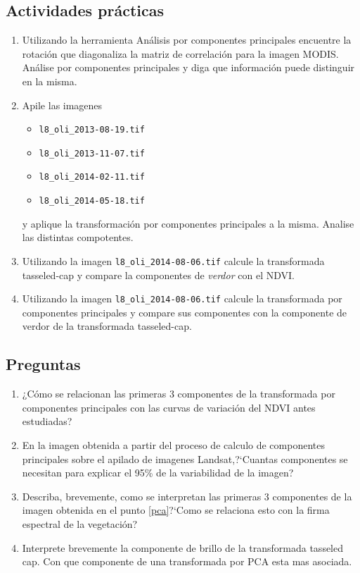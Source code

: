 \documentclass[hidelinks,12pt]{article}
\begin{document}
\subsection{Actividades pr\'acticas}\label{rot:pra}
\begin{enumerate}
    \item Utilizando la herramienta Análisis por componentes principales
        encuentre la rotación que diagonaliza la matriz de correlación para la
        imagen MODIS\@. Análise por componentes principales y diga que información puede
        distinguir en la misma. 
    \item \label{pca} Apile las imagenes
        \begin{itemize}
        \item \texttt{l8\_oli\_2013-08-19.tif}
        \item \texttt{l8\_oli\_2013-11-07.tif}
        \item \texttt{l8\_oli\_2014-02-11.tif}
        \item \texttt{l8\_oli\_2014-05-18.tif}
        \end{itemize}
        y aplique la transformaci\'on por componentes principales a la misma.
        Analise las distintas compotentes.
    \item Utilizando la imagen \texttt{l8\_oli\_2014-08-06.tif} calcule la 
        transformada tasseled-cap y compare la componentes de \emph{verdor} con el NDVI.
    \item Utilizando la imagen \texttt{l8\_oli\_2014-08-06.tif} calcule la 
        transformada por componentes principales y compare sus componentes con la
        componente de verdor de la transformada tasseled-cap.
\end{enumerate}

\subsection{Preguntas}
\begin{enumerate}
    \item ¿Cómo se relacionan las primeras 3 componentes de la transformada por
        componentes principales con las curvas de variación del NDVI antes
        estudiadas? 
    \item En la imagen obtenida a partir del proceso de calculo de componentes
        principales sobre el apilado de imagenes Landsat,?`Cuantas componentes
        se necesitan para explicar el 95\% de la variabilidad de la imagen?
    \item Describa, brevemente, como se interpretan las primeras 3 componentes
        de la imagen obtenida en el punto \ref{pca}?`Como se relaciona esto con la
        firma espectral de la vegetaci\'on?
    \item Interprete brevemente la componente de brillo de la transformada
        tasseled cap. Con que componente de una transformada por PCA esta mas
        asociada.
\end{enumerate}
\end{document}
